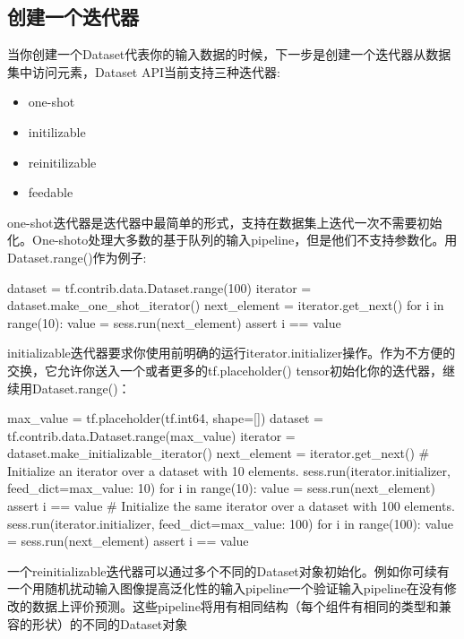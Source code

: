 \subsection{创建一个迭代器}
当你创建一个Dataset代表你的输入数据的时候，下一步是创建一个迭代器从数据集中访问元素，Dataset API当前支持三种迭代器:
\begin{itemize}
	\item one-shot
	\item initilizable
	\item reinitilizable
	\item feedable
\end{itemize}
one-shot迭代器是迭代器中最简单的形式，支持在数据集上迭代一次不需要初始化。One-shoto处理大多数的基于队列的输入pipeline，但是他们不支持参数化。用Dataset.range()作为例子:
\begin{python}
dataset = tf.contrib.data.Dataset.range(100)
iterator = dataset.make_one_shot_iterator()
next_element = iterator.get_next()
for i in range(10):
    value = sess.run(next_element)
    assert i == value
\end{python}
initializable迭代器要求你使用前明确的运行iterator.initializer操作。作为不方便的交换，它允许你送入一个或者更多的tf.placeholder() tensor初始化你的迭代器，继续用Dataset.range()：
\begin{python}
max_value = tf.placeholder(tf.int64, shape=[])
dataset = tf.contrib.data.Dataset.range(max_value)
iterator = dataset.make_initializable_iterator()
next_element = iterator.get_next()
# Initialize an iterator over a dataset with 10 elements.
sess.run(iterator.initializer, feed_dict={max_value: 10})
for i in range(10):
    value = sess.run(next_element)
    assert i == value
# Initialize the same iterator over a dataset with 100 elements.
sess.run(iterator.initializer, feed_dict={max_value: 100})
for i in range(100):
    value = sess.run(next_element)
    assert i == value
\end{python}
一个reinitializable迭代器可以通过多个不同的Dataset对象初始化。例如你可续有一个用随机扰动输入图像提高泛化性的输入pipeline一个验证输入pipeline在没有修改的数据上评价预测。这些pipeline将用有相同结构（每个组件有相同的类型和兼容的形状）的不同的Dataset对象
